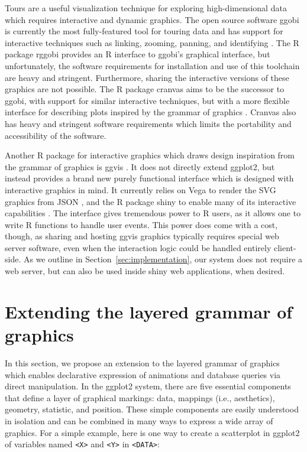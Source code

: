 \documentclass[journal]{vgtc}\usepackage[]{graphicx}\usepackage[]{color}
\begin{document}
Tours are a useful visualization technique for exploring high-dimensional data
which requires interactive and dynamic graphics. The open source software ggobi 
is currently the most fully-featured tool for touring data and has support
for interactive techniques such as linking, zooming, panning, and identifying 
\citep{ggobi:2007}. The R package rggobi \citep{rggobi} provides an R interface 
to ggobi's graphical interface, but unfortunately, the software requirements 
for installation and use of this toolchain are heavy and stringent. Furthermore,
sharing the interactive versions of these graphics are not possible. The R 
package cranvas aims to be the successor to ggobi, with support for similar
interactive techniques, but with a more flexible interface for describing 
plots inspired by the grammar of graphics \citep{cranvas}. Cranvas also has 
heavy and stringent software requirements which limits the portability and
accessibility of the software.

Another R package for interactive graphics which draws design inspiration from 
the grammar of graphics is ggvis \citep{ggvis}. It does not directly extend 
ggplot2, but instead provides a brand new purely functional interface which 
is designed with interactive graphics in mind. It currently relies on Vega to
render the SVG graphics from JSON \citep{vega}, and the R package shiny to 
enable many of its interactive capabilities \citep{shiny}. The interface gives
tremendous power to R users, as it allows one to write R functions to handle 
user events. This power does come with a cost, though, as sharing and hosting 
ggvis graphics typically requires special web server software, even when the
interaction logic could be handled entirely client-side. As we outline in 
Section~\ref{sec:implementation}, our system does not require a web server, 
but can also be used inside shiny web applications, when desired.

\section{Extending the layered grammar of graphics}

In this section, we propose an extension to the layered grammar of graphics
\citep{ggplot2-paper} which enables declarative expression of animations and
database queries via direct manipulation. In the ggplot2 system, there are five
essential components that define a layer of graphical markings: data, mappings 
(i.e., aesthetics), geometry, statistic, and position. These simple components 
are easily understood in isolation and can be combined in many ways to express
a wide array of graphics. For a simple example, here is one way to create a
scatterplot in ggplot2 of variables named \texttt{<X>} and \texttt{<Y>} in 
\texttt{<DATA>}:
\end{document}
